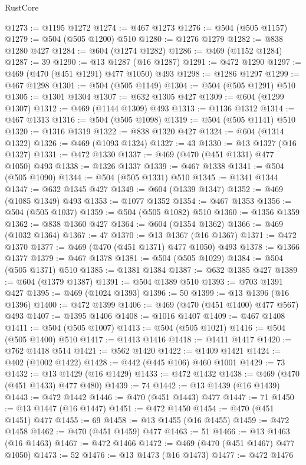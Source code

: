 \begin{lexlean}{RustCore}
\begin{coremodule}
@1273 := @1195 @1272
@1274 := @467 @1273
@1276 := @504 (@505 @1157)
@1279 := @504 (@505 @1200) @510
@1280 := @1276 @1279
@1282 := @838 @1280 @427
@1284 := @604 (@1274 @1282)
@1286 := @469 (@1152 @1284)
@1287 := 39
@1290 := @13 @1287 (@16 @1287)
@1291 := @472 @1290
@1297 := @469 (@470 (@451 @1291) @477 @1050) @493
@1298 := @1286 @1297
@1299 := @467 @1298
@1301 := @504 (@505 @1149)
@1304 := @504 (@505 @1291) @510
@1305 := @1301 @1304
@1307 := @632 @1305 @427
@1309 := @604 (@1299 @1307)
@1312 := @469 (@1144 @1309) @493
@1313 := @1136 @1312
@1314 := @467 @1313
@1316 := @504 (@505 @1098)
@1319 := @504 (@505 @1141) @510
@1320 := @1316 @1319
@1322 := @838 @1320 @427
@1324 := @604 (@1314 @1322)
@1326 := @469 (@1093 @1324)
@1327 := 43
@1330 := @13 @1327 (@16 @1327)
@1331 := @472 @1330
@1337 := @469 (@470 (@451 @1331) @477 @1050) @493
@1338 := @1326 @1337
@1339 := @467 @1338
@1341 := @504 (@505 @1090)
@1344 := @504 (@505 @1331) @510
@1345 := @1341 @1344
@1347 := @632 @1345 @427
@1349 := @604 (@1339 @1347)
@1352 := @469 (@1085 @1349) @493
@1353 := @1077 @1352
@1354 := @467 @1353
@1356 := @504 (@505 @1037)
@1359 := @504 (@505 @1082) @510
@1360 := @1356 @1359
@1362 := @838 @1360 @427
@1364 := @604 (@1354 @1362)
@1366 := @469 (@1032 @1364)
@1367 := 47
@1370 := @13 @1367 (@16 @1367)
@1371 := @472 @1370
@1377 := @469 (@470 (@451 @1371) @477 @1050) @493
@1378 := @1366 @1377
@1379 := @467 @1378
@1381 := @504 (@505 @1029)
@1384 := @504 (@505 @1371) @510
@1385 := @1381 @1384
@1387 := @632 @1385 @427
@1389 := @604 (@1379 @1387)
@1391 := @504 @1389 @510
@1393 := @703 @1391 @427
@1395 := @469 (@1024 @1393)
@1396 := 50
@1399 := @13 @1396 (@16 @1396)
@1400 := @472 @1399
@1406 := @469 (@470 (@451 @1400) @477 @567) @493
@1407 := @1395 @1406
@1408 := @1016 @1407
@1409 := @467 @1408
@1411 := @504 (@505 @1007)
@1413 := @504 (@505 @1021)
@1416 := @504 (@505 @1400) @510
@1417 := @1413 @1416
@1418 := @1411 @1417
@1420 := @762 @1418 @514
@1421 := @562 @1420
@1422 := @1409 @1421
@1424 := @402 (@1002 @1422)
@1428 := @442 (@445 @106) @460 @1001
@1429 := 73
@1432 := @13 @1429 (@16 @1429)
@1433 := @472 @1432
@1438 := @469 (@470 (@451 @1433) @477 @480)
@1439 := 74
@1442 := @13 @1439 (@16 @1439)
@1443 := @472 @1442
@1446 := @470 (@451 @1443) @477
@1447 := 71
@1450 := @13 @1447 (@16 @1447)
@1451 := @472 @1450
@1454 := @470 (@451 @1451) @477
@1455 := 69
@1458 := @13 @1455 (@16 @1455)
@1459 := @472 @1458
@1462 := @470 (@451 @1459) @477
@1463 := 51
@1466 := @13 @1463 (@16 @1463)
@1467 := @472 @1466
@1472 := @469 (@470 (@451 @1467) @477 @1050)
@1473 := 52
@1476 := @13 @1473 (@16 @1473)
@1477 := @472 @1476

\end{coremodule}
\end{lexlean}
